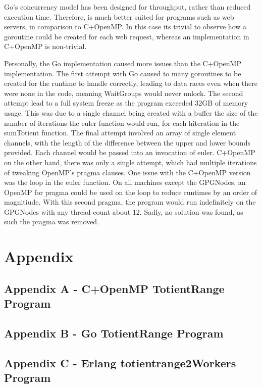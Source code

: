 \documentclass[11pt,a4paper,titlepage]{article}
\begin{document}
Go's concurrency model has been designed for throughput, rather than reduced execution time.
Therefore, is much better suited for programs such as web servers, in comparison to C+OpenMP.
In this case its trivial to observe how a goroutine could be created for each web request, whereas an implementation in C+OpenMP is non-trivial.

Personally, the Go implementation caused more issues than the C+OpenMP implementation.
The first attempt with Go caused to many goroutines to be created for the runtime to handle correctly, leading to data races even when there were none in the code, meaning WaitGroups would never unlock.
The second attempt lead to a full system freeze as the program exceeded 32GB of memory usage.
This was due to a single channel being created with a buffer the size of the number of iterations the euler function would run, for each hiteration in the sumTotient function.
The final attempt involved an array of single element channels, with the length of the difference between the upper and lower bounds provided.
Each channel would be passed into an invocation of euler.
C+OpenMP on the other hand, there was only a single attempt, which had multiple iterations of tweaking OpenMP's pragma clauses.
One issue with the C+OpenMP version was the loop in the euler function.
On all machines except the GPGNodes, an OpenMP for pragma could be used on the loop to reduce runtimes by an order of magnitiude.
With this second pragma, the program would run indefinitely on the GPGNodes with any thread count about 12.
Sadly, no solution was found, as such the pragma was removed.

\section{Appendix}
\subsection{Appendix A - C+OpenMP TotientRange Program}
\lstset{linewidth=\textwidth}


\subsection{Appendix B - Go TotientRange Program}
\lstset{linewidth=\textwidth}


\subsection{Appendix C - Erlang totientrange2Workers Program}
\lstset{linewidth=\textwidth}
{\footnotesize}
\end{document}
